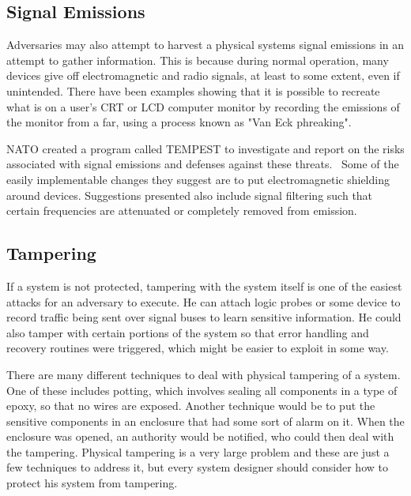 \subsection{Signal Emissions}
Adversaries may also attempt to harvest a physical systems signal emissions in an attempt to gather information. This is because during
normal operation, many devices give off electromagnetic and radio signals, at least to some extent, even if unintended. There have been
examples showing that it is possible to recreate what is on a user's CRT or LCD computer monitor by recording the emissions of the monitor
from a far, using a process known as "Van Eck phreaking".~\cite{monitor}~\cite{lcds}

NATO created a program called TEMPEST to investigate and report on the risks associated with signal emissions and defenses
against these threats.~\cite{tempest} Some of the easily implementable changes they suggest are to put electromagnetic shielding
around devices. Suggestions presented also include signal filtering such that certain frequencies are attenuated or completely removed
from emission.

\subsection{Tampering}
If a system is not protected, tampering with the system itself is one of the easiest attacks for an adversary to execute.
He can attach logic probes or some device to record traffic being sent over signal buses to learn sensitive information.
He could also tamper with certain portions of the system so that error handling and recovery routines were triggered,
which might be easier to exploit in some way.

There are many different techniques to deal with physical tampering of a system. One of these includes potting, which 
involves sealing all components in a type of epoxy, so that no wires are exposed. Another technique would be to
put the sensitive components in an enclosure that had some sort of alarm on it. When the enclosure was opened, an
authority would be notified, who could then deal with the tampering. Physical tampering is a very large problem
and these are just a few techniques to address it, but every system designer should consider how to protect his
system from tampering.
